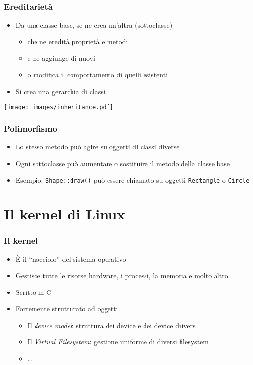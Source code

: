 \documentclass[xetex,table]{beamer}
\begin{document}
\begin{frame}
  \frametitle{Ereditarietà}
  \begin{itemize}
  \item Da una classe base, se ne crea un'altra (sottoclasse)
    \begin{itemize}
    \item che ne eredità proprietà e metodi
    \item e ne aggiunge di nuovi
    \item o modifica il comportamento di quelli esistenti
    \end{itemize}
  \item Si crea una gerarchia di classi
  \end{itemize}
  \begin{center}
    \texttt{[image: images/inheritance.pdf]}
  \end{center}
\end{frame}

\begin{frame}
  \frametitle{Polimorfismo}
  \begin{itemize}
  \item Lo stesso metodo può agire su oggetti di classi diverse
  \item Ogni sottoclasse può aumentare o sostituire il metodo della
    classe base
  \item Esempio: \texttt{Shape::draw()} può essere chiamato su oggetti
    \texttt{Rectangle} o \texttt{Circle}
  \end{itemize}
\end{frame}

\section{Il kernel di Linux}

\begin{frame}
  \frametitle{Il kernel}
  \begin{itemize}
  \item È il ``nocciolo'' del sistema operativo
  \item Gestisce tutte le risorse hardware, i processi, la memoria e
    molto altro
  \item Scritto in C
  \item Fortemente strutturato ad oggetti
    \begin{itemize}
    \item Il {\em device model}: struttura dei device e dei device drivers
    \item Il {\em Virtual Filesystem}: gestione uniforme di diversi filesystem
    \item \dots
    \end{itemize}
  \end{itemize}
\end{frame}
\end{document}
